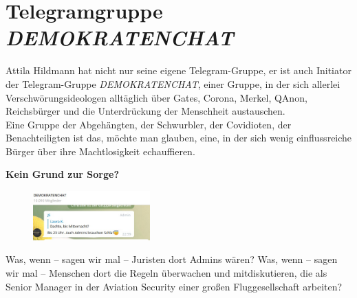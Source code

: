 \section{Telegramgruppe \textit{DEMOKRATENCHAT}}
Attila Hildmann hat nicht nur seine eigene Telegram-Gruppe, er ist auch Initiator der Telegram-Gruppe \textit{DEMOKRATENCHAT\autocite{Telegram:demokratenchat3}}, einer Gruppe, in der sich allerlei Verschwörungsideologen alltäglich über Gates, Corona, Merkel, QAnon, Reichsbürger und die Unterdrückung der Menschheit austauschen.\\
Eine Gruppe der Abgehängten, der Schwurbler, der Covidioten, der Benachteiligten ist das, möchte man glauben, eine, in der sich wenig einflussreiche Bürger über ihre Machtlosigkeit echauffieren.

\textbf{Kein Grund zur Sorge?}

\begin{figure}\centering  \vspace{-10pt}
    \includegraphics[width=0.4\textwidth]{images/image--000.jpg}
    \caption{}\label{image:0}\vspace{-24pt}
  \end{figure}
Was, wenn – sagen wir mal – Juristen dort Admins wären? Was, wenn – sagen wir mal – Menschen dort die Regeln überwachen und mitdiskutieren, die als Senior Manager in der Aviation Security einer großen Fluggesellschaft arbeiten?
\begin{figure}
  \caption{}
\end{figure}

